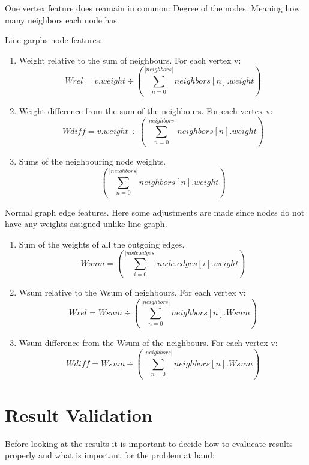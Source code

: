 One vertex feature does reamain in common: Degree of the nodes. Meaning how many neighbors each node has.

Line garphs node features:  

\begin{enumerate}
\item Weight relative to the sum of neighbours. For each vertex v:  \[ Wrel = v.weight  \div  (\sum_{n=0}^{|neighbors|} neighbors[n].weight) \]
\item Weight difference from the sum of the neighbours. For each vertex v:  \[ Wdiff = v.weight  \div  (\sum_{n=0}^{|neighbors|} neighbors[n].weight) \]
\item Sums of the neighbouring node weights. \[ (\sum_{n=0}^{|neighbors|} neighbors[n].weight) \]
\end{enumerate}

Normal graph edge features. Here some adjustments are made since nodes do not have any weights assigned unlike line graph.

\begin{enumerate}
\item Sum of the weights of all the outgoing edges.  \[ Wsum = (\sum_{i=0}^{|node.edges|} node.edges[i].weight) \]
\item Wsum relative to the Wsum of neighbours. For each vertex v:  \[ Wrel = Wsum \div (\sum_{n=0}^{|neighbors|} neighbors[n].Wsum) \]
\item Wsum difference from the Wsum of the neighbours. For each vertex v: \[ Wdiff = Wsum \div (\sum_{n=0}^{|neighbors|} neighbors[n].Wsum) \]
\end{enumerate}

\section{Result Validation}

Before looking at the results it is important to decide how to evalueate results properly and what is important for the problem at hand:

